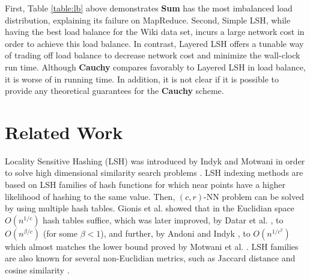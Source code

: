 \documentclass{acm_proc_article-sp}
\numberwithin{equation}{section}
\numberwithin{figure}{section}
\newcommand{\comment}[1]{}
\begin{document}
First, Table \ref{table:lb} above demonstrates {\bf Sum} has the most imbalanced load distribution, explaining its failure on MapReduce. Second, Simple LSH, while having the best load balance for the Wiki data set, incurs a large network cost in order to achieve this load balance. In contrast, Layered LSH offers a tunable way of trading off load balance to decrease network cost and minimize the wall-clock run time. Although {\bf Cauchy} compares favorably to Layered LSH in load balance, it is worse of in running time. In addition, it is not clear if it is possible to provide any theoretical guarantees for the {\bf Cauchy} scheme.



\section{Related Work}
\label{sec:rel}  

\comment{
The methods proposed in the literature for similarity search via nearest neighbors (NN) can be, broadly speaking, classified to data or space partitioning methods and Locality Sensitive Hashing (LSH) techniques. Space partitioning methods, such as $K$-D trees \cite{Bentley:kdtree}, and data partitioning methods, such as R-trees \cite{Rtrees} and SR-trees \cite{SRtrees}, solve the NN problem by pruning the set of candidates for each query using branch and bound techniques. However, they do not scale well with the data dimension, and can in fact be even slower than a brute force sequential scan of the data set when the dimension exceeds $10$ \cite{expt:space:partitioning}. For further details on these methods the reader is referred to the survey by Fodor \cite{Fodor}. 
}

Locality Sensitive Hashing (LSH) was introduced by Indyk and Motwani in order to solve high dimensional similarity search problems \cite{im98}. 
LSH indexing methods are based on LSH families of hash functions for which near points have a higher likelihood of hashing to the same value. Then, $(c,r)$-NN problem can be solved by using multiple hash tables. Gionis et al. \cite{gim99} showed that in the Euclidian space $O(n^{1/c})$ hash tables suffice, which was later improved, by Datar et al. \cite{DIIM04}, to $O(n^{\beta/c})$ (for some $\beta<1$), and further, by Andoni and Indyk \cite{AI06}, to $O(n^{1/{c^2}})$ which almost matches the lower bound proved by Motwani et al. \cite{MNP06}. LSH families are also known for several non-Euclidian metrics, such as Jaccard distance \cite{Broder} and cosine similarity \cite{C02}. 
\end{document}
